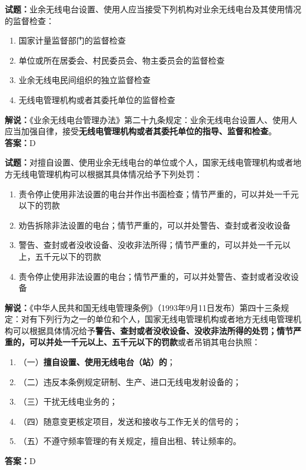 \documentclass{ctexbook}
\begin{document}
\bigskip


\noindent\textbf{试题：}业余无线电台设置、使用人应当接受下列机构对业余无线电台及其使用情况的监督检查：
\begin{enumerate}[leftmargin=3em]
\item 国家计量监督部门的监督检查
\item 单位或所在居委会、村民委员会、物主委员会的监督检查
\item 业余无线电民间组织的独立监督检查
\item 无线电管理机构或者其委托单位的监督检查
\end{enumerate}
\noindent\textbf{解说：}《业余无线电台管理办法》第二十九条规定：业余无线电台设置人、使用人应当加强自律，接受\textbf{无线电管理机构或者其委托单位的指导、监督和检查}。\\\noindent\textbf{答案：}D



\bigskip


\noindent\textbf{试题：}对擅自设置、使用业余无线电台的单位或个人，国家无线电管理机构或者地方无线电管理机构可以根据其具体情况给予下列处罚：
\begin{enumerate}[leftmargin=3em]
\item 责令停止使用非法设置的电台并作出书面检查；情节严重的，可以并处一千元以下的罚款
\item 劝告拆除非法设置的电台；情节严重的，可以并处警告、查封或者没收设备
\item 警告、查封或者没收设备、没收非法所得；情节严重的，可以并处一千元以上，五千元以下的罚款
\item 责令停止使用非法设置的电台；情节严重的，可以并处警告、查封或者没收设备
\end{enumerate}
\noindent\textbf{解说：}《中华人民共和国无线电管理条例》（1993年9月11日发布）第四十三条规定：对有下列行为之一的单位和个人，国家无线电管理机构或者地方无线电管理机构可以根据具体情况给予\textbf{警告、查封或者没收设备、没收非法所得的处罚；情节严重的，可以并处一千元以上、五千元以下的罚款}或者吊销其电台执照：
\begin{enumerate}[leftmargin=3em, label=]
	\item（一）\textbf{擅自设置、使用无线电台（站）的}；
	\item（二）违反本条例规定研制、生产、进口无线电发射设备的；
	\item（三）干扰无线电业务的；
	\item（四）随意变更核定项目，发送和接收与工作无关的信号的；
	\item（五）不遵守频率管理的有关规定，擅自出租、转让频率的。
\end{enumerate}
\textbf{答案：}D
\end{document}
